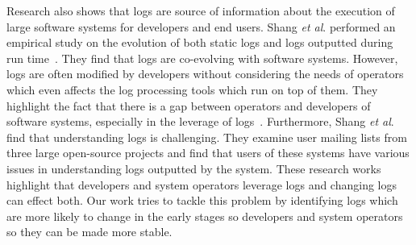 Research also shows that logs are source of information about the execution of large software systems for developers and end users. Shang \textsl{et al$ . $} performed an empirical study on the evolution of both static logs and logs outputted during run time~\cite{EMSEIAN,PaperIanCIIII}. They find that logs are co-evolving with software systems. However, logs are often modified by developers without considering the needs of operators which even affects the log processing tools which run on top of them. They highlight the fact that there is a gap between operators and developers of software systems, especially in the leverage of logs~\cite{IanGap}. Furthermore, Shang\textsl{ et al$ . $}~\cite{IanIcesm} find that understanding logs is challenging. They examine user mailing lists from three large open-source projects and find that users of these systems have various issues in understanding logs outputted by the system. These research works highlight that developers and system operators leverage logs and changing logs can effect both. Our work tries to tackle this problem by identifying logs which are more likely to change in the early stages so developers and system operators so they can be made more stable.  
